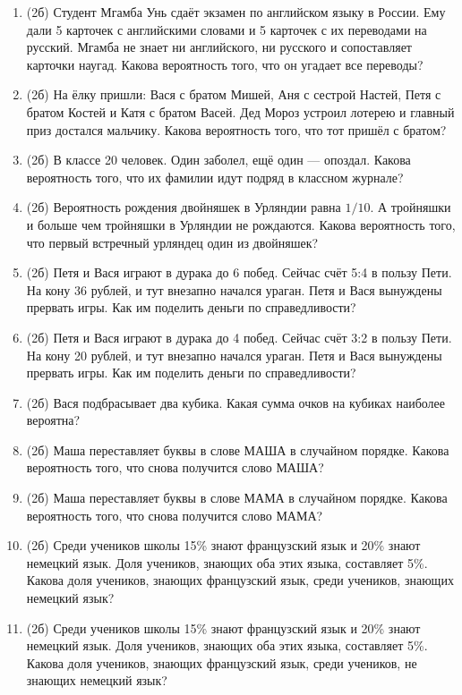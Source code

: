 \documentclass[a4paper, 12pt]{article}
\begin{document}
\newpage
\begin{enumerate}
  \item (2б) Студент Мгамба Унь сдаёт экзамен по английском языку в России. Ему дали 5 карточек с английскими словами и 5 карточек с их переводами на русский. Мгамба не знает ни английского, ни русского и сопоставляет карточки наугад. Какова вероятность того, что он угадает все переводы?
  \item (2б) На ёлку пришли: Вася с братом Мишей, Аня с сестрой Настей, Петя с братом Костей и Катя с братом Васей. Дед Мороз устроил лотерею и главный приз достался мальчику. Какова вероятность того, что тот пришёл с братом?
  \item (2б) В классе 20 человек. Один заболел, ещё один — опоздал. Какова вероятность того, что их фамилии идут подряд в классном журнале?
  \item (2б) Вероятность рождения двойняшек в Урляндии равна $1/10$. А тройняшки и больше чем тройняшки в Урляндии не рождаются. Какова вероятность того, что первый встречный урляндец один из двойняшек?
  \item (2б) Петя и Вася играют в дурака до 6 побед. Сейчас счёт 5:4 в пользу Пети. На кону 36 рублей, и тут внезапно начался ураган. Петя и Вася вынуждены прервать игры. Как им поделить деньги по справедливости?
  \item (2б) Петя и Вася играют в дурака до 4 побед. Сейчас счёт 3:2 в пользу Пети. На кону 20 рублей, и тут внезапно начался ураган. Петя и Вася вынуждены прервать игры. Как им поделить деньги по справедливости?
  \item (2б) Вася подбрасывает два кубика. Какая сумма очков на кубиках наиболее вероятна?
  \item (2б) Маша переставляет буквы в слове МАША в случайном порядке. Какова вероятность того, что снова получится слово МАША?
  \item (2б) Маша переставляет буквы в слове МАМА в случайном порядке. Какова вероятность того, что снова получится слово МАМА?
  \item (2б) Среди учеников школы 15\% знают французский язык и 20\% знают немецкий язык. Доля учеников, знающих оба этих языка, составляет 5\%. Какова доля учеников, знающих французский язык, среди учеников, знающих немецкий язык?
  \item (2б) Среди учеников школы 15\% знают французский язык и 20\% знают немецкий язык. Доля учеников, знающих оба этих языка, составляет 5\%. Какова доля учеников, знающих французский язык, среди учеников, не знающих немецкий язык?

\end{enumerate}
\end{document}
